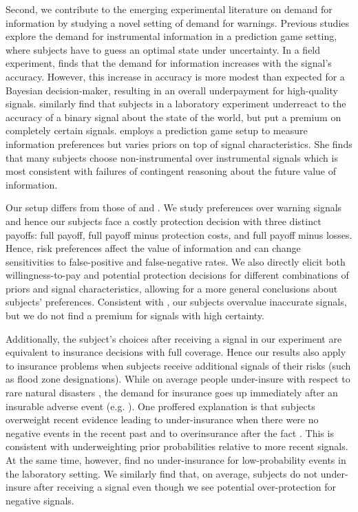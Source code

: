 \documentclass[12pt,a4paper]{article}
\begin{document}
Second, we contribute to the emerging experimental literature on demand for information by studying a novel setting of demand for warnings. Previous studies explore the demand for instrumental information in a prediction game setting, where subjects have to guess an optimal state under uncertainty. In a field experiment, \citet{hoffman_how_2016} finds that the demand for information increases with the signal's accuracy. However, this increase in accuracy is more modest than expected for a Bayesian decision-maker, resulting in an overall underpayment for high-quality signals. \citet{ambuehl_belief_2018} similarly find that subjects in a laboratory experiment underreact to the accuracy of a binary signal about the state of the world, but put a premium on completely certain signals. \citet{xu_revealed_2022} employs a prediction game setup to measure information preferences but varies priors on top of signal characteristics. She finds that many subjects choose non-instrumental over instrumental signals which is most consistent with failures of contingent reasoning about the future value of information.  

Our setup differs from those of \citet{ambuehl_belief_2018} and \citet{xu_revealed_2022}. We study preferences over warning signals and hence our subjects face a costly protection decision with three distinct payoffs: full payoff, full payoff minus protection costs, and full payoff minus losses. Hence, risk preferences affect the value of information and can change sensitivities to false-positive and false-negative rates. We also directly elicit both willingness-to-pay and potential protection decisions for different combinations of priors and signal characteristics, allowing for a more general conclusions about subjects' preferences. Consistent with \citet{ambuehl_belief_2018}, our subjects overvalue inaccurate signals, but we do not find a premium for signals with high certainty.  

Additionally, the subject's choices after receiving a signal in our experiment are equivalent to insurance decisions with full coverage. Hence our results also apply to insurance problems when subjects receive additional signals of their risks (such as flood zone designations). While on average people under-insure with respect to rare natural disasters \citep{friedl_insurance_2014}, the demand for insurance goes up immediately after an insurable adverse event (e.g. \citep{kousky_understanding_2011}). One proffered explanation is that subjects overweight recent evidence leading to under-insurance when there were no negative events in the recent past and to overinsurance after the fact \citep{volkman-wise_representativeness_2015}. This is consistent with underweighting prior probabilities relative to more recent signals. At the same time, however, \citet{laury_insurance_2009} find no under-insurance for low-probability events in the laboratory setting.  We similarly find that, on average, subjects do not under-insure after receiving a signal even though we see potential over-protection for negative signals.
\end{document}
